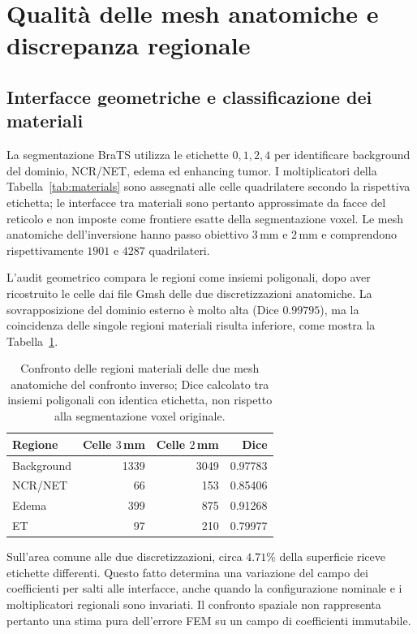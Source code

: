 \section{Qualit\`a delle mesh anatomiche e discrepanza regionale}\label{app:anatomy}
\subsection*{Interfacce geometriche e classificazione dei materiali}
La segmentazione BraTS utilizza le etichette $0,1,2,4$ per identificare background del dominio, NCR/NET, edema ed enhancing tumor. I moltiplicatori della Tabella~\ref{tab:materials} sono assegnati alle celle quadrilatere secondo la rispettiva etichetta; le interfacce tra materiali sono pertanto approssimate da facce del reticolo e non imposte come frontiere esatte della segmentazione voxel. Le mesh anatomiche dell'inversione hanno passo obiettivo $3\,$mm e $2\,$mm e comprendono rispettivamente $1901$ e $4287$ quadrilateri.

L'audit geometrico compara le regioni come insiemi poligonali, dopo aver ricostruito le celle dai file Gmsh delle due discretizzazioni anatomiche. La sovrapposizione del dominio esterno \`e molto alta (Dice $0.99795$), ma la coincidenza delle singole regioni materiali risulta inferiore, come mostra la Tabella~\ref{tab:app-mesh-compare}.
\begin{table}[H]
\centering\caption{Confronto delle regioni materiali delle due mesh anatomiche del confronto inverso; Dice calcolato tra insiemi poligonali con identica etichetta, non rispetto alla segmentazione voxel originale.}\label{tab:app-mesh-compare}
\small\setlength{\tabcolsep}{4pt}
\begin{tabular}{@{}lrrr@{}}\toprule
Regione&Celle $3\,$mm&Celle $2\,$mm&Dice\\\midrule
Background&1339&3049&0.97783\\
NCR/NET&66&153&0.85406\\
Edema&399&875&0.91268\\
ET&97&210&0.79977\\\bottomrule
\end{tabular}
\end{table}

Sull'area comune alle due discretizzazioni, circa $4.71\%$ della superficie riceve etichette differenti. Questo fatto determina una variazione del campo dei coefficienti per salti alle interfacce, anche quando la configurazione nominale e i moltiplicatori regionali sono invariati. Il confronto spaziale non rappresenta pertanto una stima pura dell'errore FEM su un campo di coefficienti immutabile.

